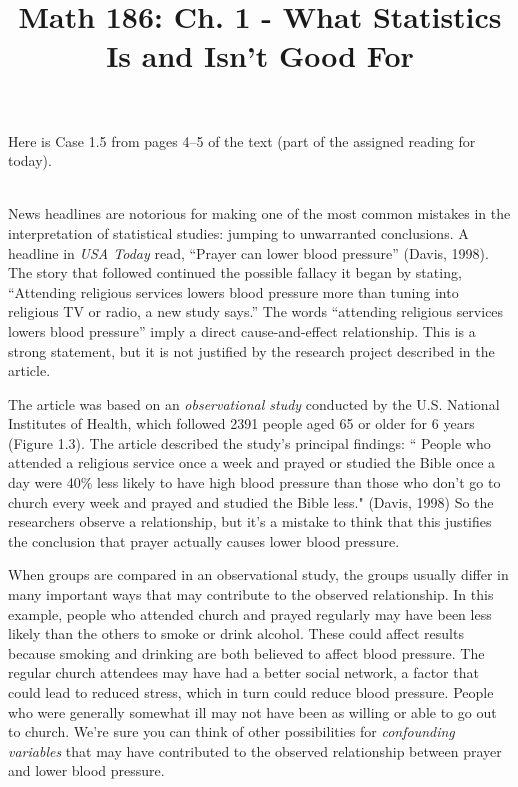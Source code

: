\documentclass[12pt]{amsart}
\title{Math 186: Ch. 1 - What Statistics Is and Isn't Good For}
\begin{document}
\maketitle

\vspace{0.2in}
\vspace{0.2in}




Here is Case 1.5 from pages 4--5 of the text (part of the assigned reading for today).\\ \\

{\narrower
News headlines are notorious for making one of the most common mistakes in the interpretation of statistical studies: jumping to unwarranted conclusions. A headline in {\it USA Today} read, ``Prayer can lower blood pressure'' (Davis, 1998). The story that followed continued the possible fallacy it began by stating, ``Attending religious services lowers blood pressure more than tuning into religious TV or radio, a new study says.'' The words ``attending religious services lowers blood pressure'' imply a direct cause-and-effect relationship. This is a strong statement, but it is not justified by the research project described in the article.

The article was based on an {\it observational study} conducted by the U.S. National Institutes of Health, which followed 2391 people aged 65 or older for 6 years (Figure 1.3). The article described the study's principal findings: `` People who attended a religious service once a week and prayed or studied the Bible once a day were 40\% less likely to have high blood pressure than those who don't go to church every week and prayed and studied the Bible less." (Davis, 1998) So the researchers observe a relationship, but it's a mistake to think that this justifies the conclusion that prayer actually causes lower blood pressure.

When groups are compared in an observational study, the groups usually differ in many important ways that may contribute to the observed relationship. In this example, people who attended church and prayed regularly may have been less likely than the others to smoke or drink alcohol. These could affect results because smoking and drinking are both believed to affect blood pressure. The regular church attendees may have had a better social network, a factor that could lead to reduced stress, which in turn could reduce blood pressure. People who were generally somewhat ill may not have been as willing or able to go out to church. We're sure you can think of other possibilities for {\it confounding variables} that may have contributed to the observed relationship between prayer and lower blood pressure.

}
\end{document}
